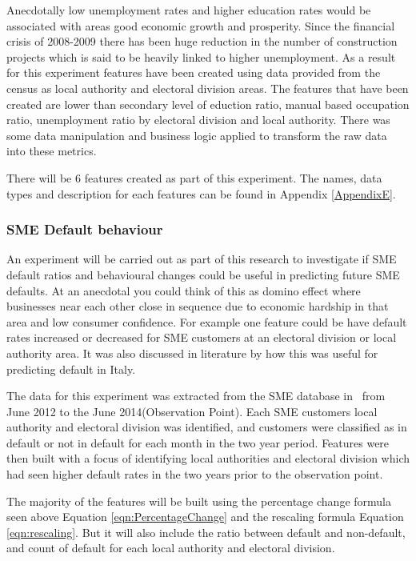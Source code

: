 Anecdotally low unemployment rates and higher education rates would be associated with areas good economic growth and prosperity. Since the financial crisis of 2008-2009 there has been huge reduction in the number of construction projects which is said to be heavily linked to higher unemployment. As a result for this experiment features have been created using data provided from the census as local authority and electoral division areas. The features that have been created are lower than secondary level of eduction ratio, manual based occupation ratio, unemployment ratio by electoral division and local authority. There was some data manipulation and business logic applied to transform the raw data into these metrics.

There will be 6 features created as part of this experiment. The names, data types and description for each features can be found in Appendix \ref{AppendixE}.



\subsubsection{SME Default behaviour}
An experiment will be carried out as part of this research to investigate if SME default ratios and behavioural changes could be useful in predicting future SME defaults. At an anecdotal you could think of this as domino effect where businesses near each other close in sequence due to economic hardship in that area and low consumer confidence. For example one feature could be have default rates increased or decreased for SME customers at an electoral division or local authority area. It was also discussed in literature by \cite{di_pietro_regional} how this was useful for predicting default in Italy. 

The data for this experiment was extracted from the SME database in \subjectname\ from June 2012 to the June 2014(Observation Point). Each SME customers local authority and electoral division was identified, and customers were classified as in default or not in default for each month in the two year period. Features were then built with a focus of identifying local authorities and electoral division which had seen higher default rates in the two years prior to the observation point. 

The majority of the features will be built using the percentage change formula seen above Equation \ref{eqn:PercentageChange} and the rescaling formula Equation \ref{eqn:rescaling}. But it will also include the ratio between default and non-default, and count of default for each local authority and electoral division.

